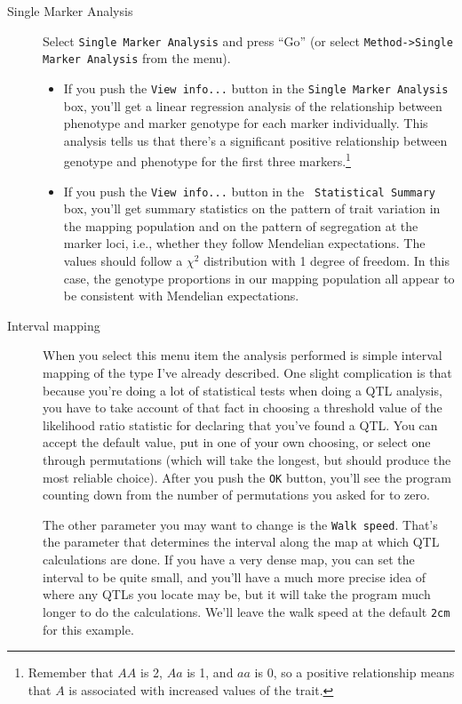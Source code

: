 \begin{description}

\item[Single Marker Analysis] Select {\tt Single Marker Analysis} and
  press ``Go''  (or select {\tt Method->Single Marker Analysis} from the menu).

\begin{itemize}

\item If you push the {\tt View info...} button in the {\tt Single
    Marker Analysis} box, you'll get a linear regression analysis of
  the relationship between phenotype and marker genotype for each
  marker individually. This analysis tells us that there's a
  significant positive relationship between genotype and phenotype for
  the first three markers.\footnote{Remember that $AA$ is 2, $Aa$ is
    1, and $aa$ is 0, so a positive relationship means that $A$ is
    associated with increased values of the trait.}

\item If you push the {\tt View info...} button in the {\tt
  Statistical Summary} box, you'll get summary statistics on the
  pattern of trait variation in the mapping population and on the
  pattern of segregation at the marker loci, i.e., whether they follow
  Mendelian expectations. The values should follow a $\chi^2$
  distribution with 1 degree of freedom. In this case, the genotype
  proportions in our mapping population all appear to be consistent
  with Mendelian expectations.

\end{itemize}

\item[Interval mapping] When you select this menu item the analysis
  performed is simple interval mapping of the type I've already
  described. One slight complication is that because you're doing a
  lot of statistical tests when doing a QTL analysis, you have to take
  account of that fact in choosing a threshold value of the likelihood
  ratio statistic for declaring that you've found a QTL. You can
  accept the default value, put in one of your own choosing, or select
  one through permutations (which will take the longest, but should
  produce the most reliable choice). After you push the {\tt OK}
  button, you'll see the program counting down from the number of
  permutations you asked for to zero. 

  The other parameter you may want to change is the {\tt Walk
  speed}. That's the parameter that determines the interval along the
  map at which QTL calculations are done. If you have a very dense
  map, you can set the interval to be quite small, and you'll have a
  much more precise idea of where any QTLs you locate may be, but it
  will take the program much longer to do the calculations. We'll
  leave the walk speed at the default {\tt 2cm} for this example.


\end{description}
